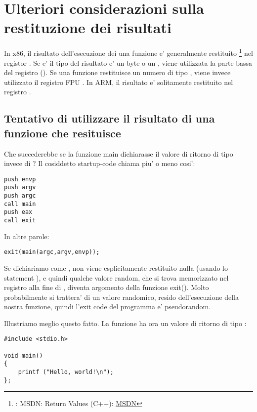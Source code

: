 \section{Ulteriori considerazioni sulla restituzione dei risultati}


In x86, il risultato dell'esecuzione dei una funzione e' generalmente restituito
\footnote{\Seealso: MSDN: Return Values (C++): \href{http://go.yurichev.com/17258}{MSDN}}
nel registor \EAX. 
Se e' il tipo del risultato e' un byte o un \Tchar, viene utilizzata la parte bassa del registro \EAX (\AL). 
Se una funzione restituisce un numero di tipo \Tfloat, viene invece utilizzato il registro FPU .
In ARM, il risultato e' solitamente restituito nel registro .

\subsection{Tentativo di utilizzare il risultato di una funzione che resituisce \Tvoid}

Che succederebbe se la funzione main dichiarasse il valore di ritorno di tipo \Tvoid invece di \Tint?
Il cosiddetto startup-code chiama \main piu' o meno cosi':

\begin{lstlisting}
push envp
push argv
push argc
call main
push eax
call exit
\end{lstlisting}

In altre parole:

\begin{lstlisting}
exit(main(argc,argv,envp));
\end{lstlisting}

Se dichiariamo \main come \Tvoid, non viene esplicitamente restituito nulla  (usando lo statement ),
e quindi qualche valore random, che si trova memorizzato nel registro \EAX alla fine di \main, diventa argomento della funzione exit().
Molto probabilmente si trattera' di un valore randomico, resido dell'esecuzione della nostra funzione, quindi l'exit code del programma 
e' pseudorandom.
\par
Illustriamo meglio questo fatto. 
La funzione \main ha ora un valore di ritorno di tipo \Tvoid:

\begin{lstlisting}
#include <stdio.h>

void main()
{
	printf ("Hello, world!\n");
};
\end{lstlisting}

